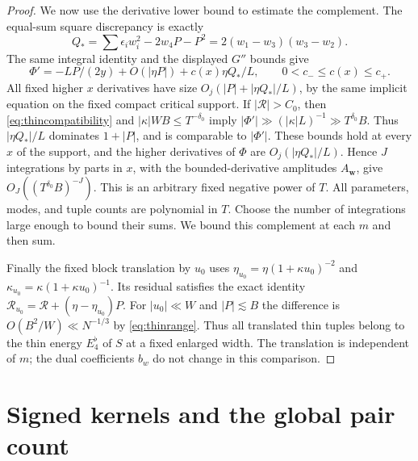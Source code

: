 \documentclass[11pt]{amsart}
\numberwithin{equation}{section}
\begin{document}
\begin{proof}
We now use the derivative lower bound to estimate the complement.
The equal-sum square discrepancy is exactly
\[
 Q_* =\sum\epsilon_iw_i^2-2w_4P-P^2
      =2(w_1-w_3)(w_3-w_2).
\]
The same integral identity and the displayed $G''$ bounds give
\[
 \Phi'=-LP/(2y)+O(|\eta P|)+c(x)\eta Q_*/L,
 \qquad 0<c_-\le c(x)\le c_+.
\]
All fixed higher $x$ derivatives have size
$O_j(|P|+|\eta Q_*|/L)$, by the same implicit equation on the
fixed compact critical support. If $|\mathcal R|>C_0$, then
\eqref{eq:thincompatibility} and $|\kappa|WB\le T^{-\delta_0}$ imply
$|\Phi'|\gg(|\kappa|L)^{-1}\gg T^{\delta_0}B$.
Thus $|\eta Q_*|/L$ dominates $1+|P|$, and is comparable to
$|\Phi'|$. These bounds hold at every $x$ of the support, and the
higher derivatives of $\Phi$ are $O_j(|\eta Q_*|/L)$. Hence $J$
integrations by parts in $x$, with the
bounded-derivative amplitudes $A_{\mathbf w}$, give
$O_J((T^{\delta_0}B)^{-J})$. This is an arbitrary fixed negative
power of $T$. All parameters, modes, and tuple counts are polynomial
in $T$. Choose the number of integrations large enough to bound their sums.
We bound this complement at each $m$ and then sum.

Finally the fixed block translation by $u_0$ uses
$\eta_{u_0}=\eta(1+\kappa u_0)^{-2}$ and
$\kappa_{u_0}=\kappa(1+\kappa u_0)^{-1}$.
Its residual satisfies the exact identity
$\mathcal R_{u_0}=\mathcal R+(\eta-\eta_{u_0})P$.
For $|u_0|\ll W$ and $|P|\lesssim B$ the difference is
$O(B^2/W)\ll N^{-1/3}$ by \eqref{eq:thinrange}.
Thus all translated thin tuples belong to the thin energy
$E_4^\flat$ of $S$ at a fixed enlarged width. The translation is
independent of $m$; the dual coefficients $b_w$ do not change in this
comparison.
\end{proof}

\section{Signed kernels and the global pair count}
\end{document}
